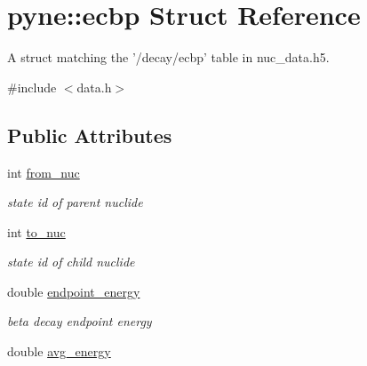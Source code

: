 \hypertarget{structpyne_1_1ecbp}{\section{pyne\-:\-:ecbp Struct Reference}
\label{structpyne_1_1ecbp}
}


A struct matching the '/decay/ecbp' table in nuc\-\_\-data.\-h5.  




{\ttfamily \#include $<$data.\-h$>$}

\subsection*{Public Attributes}
\begin{DoxyCompactItemize}
\item 
\hypertarget{structpyne_1_1ecbp_a0f0a1b5d1058f568e1a9c272a8ccdbb4}{int \hyperlink{structpyne_1_1ecbp_a0f0a1b5d1058f568e1a9c272a8ccdbb4}{from\-\_\-nuc}}\label{structpyne_1_1ecbp_a0f0a1b5d1058f568e1a9c272a8ccdbb4}

\begin{DoxyCompactList}\small\item\em state id of parent nuclide \end{DoxyCompactList}\item 
\hypertarget{structpyne_1_1ecbp_a92cad3076b4ede90958ff54a5d42d9c6}{int \hyperlink{structpyne_1_1ecbp_a92cad3076b4ede90958ff54a5d42d9c6}{to\-\_\-nuc}}\label{structpyne_1_1ecbp_a92cad3076b4ede90958ff54a5d42d9c6}

\begin{DoxyCompactList}\small\item\em state id of child nuclide \end{DoxyCompactList}\item 
\hypertarget{structpyne_1_1ecbp_aa45b0d60f6e64b89f9eb7f6ecac34075}{double \hyperlink{structpyne_1_1ecbp_aa45b0d60f6e64b89f9eb7f6ecac34075}{endpoint\-\_\-energy}}\label{structpyne_1_1ecbp_aa45b0d60f6e64b89f9eb7f6ecac34075}

\begin{DoxyCompactList}\small\item\em beta decay endpoint energy \end{DoxyCompactList}\item 
\hypertarget{structpyne_1_1ecbp_a2ecaf87cb93b936c48f89465958d47f7}{double \hyperlink{structpyne_1_1ecbp_a2ecaf87cb93b936c48f89465958d47f7}{avg\-\_\-energy}}\label{structpyne_1_1ecbp_a2ecaf87cb93b936c48f89465958d47f7}


\end{DoxyCompactItemize}
